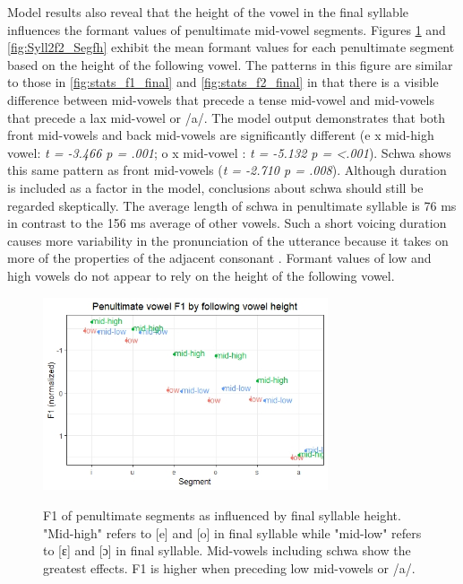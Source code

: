 \documentclass[12pt]{ouparticle}
\begin{document}
\newpage


Model results also reveal that the height of the vowel in the final syllable influences the formant values of penultimate mid-vowel segments. Figures \ref{fig:Syll2f1_Segfh} and \ref{fig:Syll2f2_Segfh} exhibit the mean formant values for each penultimate segment based on the height of the following vowel. The patterns in this figure are similar to those in \ref{fig:stats_f1_final} and \ref{fig:stats_f2_final} in that there is a visible difference between mid-vowels that precede a tense mid-vowel and mid-vowels that precede a lax mid-vowel or /a/. The model output demonstrates that both front mid-vowels and back mid-vowels are significantly different (e x mid-high vowel: \textit{t = -3.466  p = .001}; o x mid-vowel : \textit{t = -5.132  p = <.001}). Schwa shows this same pattern as front mid-vowels (\textit{t = -2.710  p = .008}). Although duration is included as a factor in the model, conclusions about schwa should still be regarded skeptically. The average length of schwa in penultimate syllable is 76 ms in contrast to the 156 ms average of other vowels. Such a short voicing duration causes more variability in the pronunciation of the utterance because it takes on more of the properties of the adjacent consonant \citep{lindblom1963}. Formant values of low and high vowels do not appear to rely on the height of the following vowel.
 
\begin{figure}[h!]
\centering
    \caption{F1 of penultimate segments as influenced by final syllable height. "Mid-high" refers to [e] and [o] in final syllable while "mid-low" refers to [ɛ] and [ɔ] in final syllable. Mid-vowels including schwa show the greatest effects. F1 is higher when preceding low mid-vowels or /a/.}
    \includegraphics[width=0.75\textwidth]{Figure9.jpg}
    \label{fig:Syll2f1_Segfh}
\end{figure}
\end{document}
